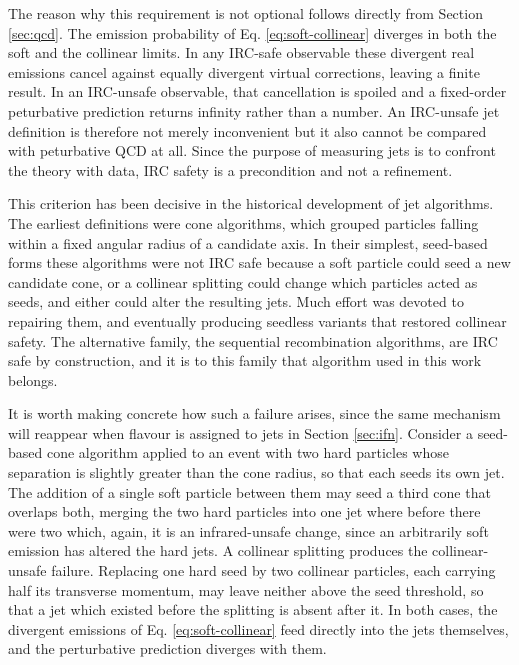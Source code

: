 The reason why this requirement is not optional follows directly from
Section \ref{sec:qcd}. The emission probability of Eq. \eqref{eq:soft-collinear}
diverges in both the soft and the collinear limits. In any IRC-safe observable
these divergent real emissions cancel against equally divergent virtual
corrections, leaving a finite result. In an IRC-unsafe observable, that cancellation
is spoiled and a fixed-order peturbative prediction returns infinity rather than a number.
An IRC-unsafe jet definition is therefore not merely inconvenient but it also cannot
be compared with peturbative QCD at all. Since the purpose of measuring jets is to
confront the theory with data, IRC safety is a precondition and not a refinement.

This criterion has been decisive in the historical development of jet algorithms.
The earliest definitions were cone algorithms, which grouped particles falling 
within a fixed angular radius of a candidate axis. In their simplest, seed-based
forms these algorithms were not IRC safe because a soft particle could seed a new
candidate cone, or a collinear splitting could change which particles acted as seeds,
and either could alter the resulting jets. Much effort was devoted to repairing
them, and eventually producing seedless variants that restored collinear safety.
The alternative family, the sequential recombination algorithms, are IRC safe by
construction, and it is to this family that algorithm used in this work belongs.

It is worth making concrete how such a failure arises, since the same mechanism
will reappear when flavour is assigned to jets in Section \ref{sec:ifn}. Consider
a seed-based cone algorithm applied to an event with two hard particles whose
separation is slightly greater than the cone radius, so that each seeds its own
jet. The addition of a single soft particle between them may seed a third cone
that overlaps both, merging the two hard particles into one jet where before
there were two which, again, it is an infrared-unsafe change,
since an arbitrarily soft emission has altered the hard jets.
A collinear splitting produces the collinear-unsafe failure.
Replacing one hard seed by two collinear particles, each
carrying half its transverse momentum, may leave neither above the seed threshold,
so that a jet which existed before the splitting is absent after it. In both cases,
the divergent emissions of Eq. \eqref{eq:soft-collinear} feed directly into the
jets themselves, and the perturbative prediction diverges with them.

